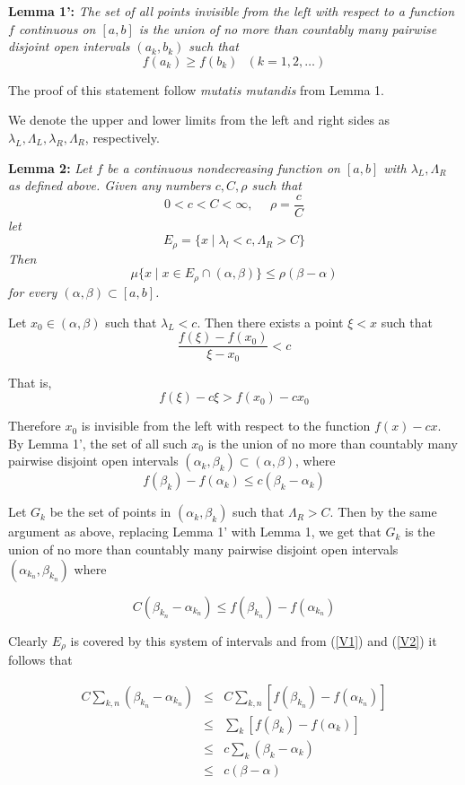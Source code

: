 \documentclass[11pt]{article}
\begin{document}
\begin{enumerate}
\textbf{Lemma 1':} \emph{The set of all points invisible from the left with respect to a function $f$ continuous on $[a,b]$ is the union of no more than countably many pairwise disjoint open intervals $(a_k,b_k)$ such that
\[
f(a_k) \geq f(b_k) \,\,\,\,(k=1,2,\ldots)
\]}

The proof of this statement follow \emph{mutatis mutandis} from Lemma 1.

We denote the upper and lower limits from the left and right sides as $\lambda_L, \Lambda_L, \lambda_R, \Lambda_R$, respectively.

\textbf{Lemma 2:} \emph{Let $f$ be a continuous nondecreasing function on $[a,b]$ with $\lambda_L, \Lambda_R$ as defined above.  Given any numbers $c,C, \rho$ such that
\[
0<c<C<\infty,\,\,\,\,\,\,\,\,\rho=\frac{c}{C}
\]
let
\[
E_\rho = \{x \mid \lambda_l < c, \Lambda_R>C\}
\]
Then
\[
\mu\{x \mid x \in E_\rho \cap (\alpha,\beta) \} \leq \rho(\beta - \alpha)
\]
for every $(\alpha, \beta) \subset [a,b]$.}

Let $x_0 \in (\alpha, \beta)$ such that $\lambda_L < c$.  Then there exists a point $\xi < x$ such that
\[
\frac{f(\xi) - f(x_0)}{\xi - x_0} < c
\]

That is,
\[
f(\xi) - c\xi > f(x_0) - cx_0
\]

Therefore $x_0$ is invisible from the left with respect to the function $f(x) - cx$.  By Lemma 1', the set of all such $x_0$ is the union of no more than countably many pairwise disjoint open intervals $(\alpha_k,\beta_k) \subset (\alpha,\beta)$, where
\begin{equation}
\label{V1}
f(\beta_k) - f(\alpha_k) \leq c(\beta_k - \alpha_k)
\end{equation}

Let $G_k$ be the set of points in $(\alpha_k, \beta_k)$ such that $\Lambda_R > C$.  Then by the same argument as above, replacing Lemma 1' with Lemma 1, we get that $G_k$ is the union of no more than countably many pairwise disjoint open intervals $(\alpha_{k_n}, \beta_{k_n})$ where

\begin{equation}
\label{V2}
C(\beta_{k_n} - \alpha_{k_n}) \leq f(\beta_{k_n}) - f(\alpha_{k_n})
\end{equation}

Clearly $E_\rho$ is covered by this system of intervals and from (\ref{V1}) and (\ref{V2}) it follows that

\begin{eqnarray*}
C \sum_{k,n} (\beta_{k_n} - \alpha_{k_n}) &\leq& C \sum_{k,n} [f(\beta_{k_n}) - f(\alpha_{k_n})] \\
&\leq& \sum_{k} [f(\beta_k) - f(\alpha_k)] \\
&\leq& c \sum_{k} (\beta_k - \alpha_k) \\
&\leq& c(\beta - \alpha)
\end{eqnarray*}


\end{enumerate}
\end{document}
